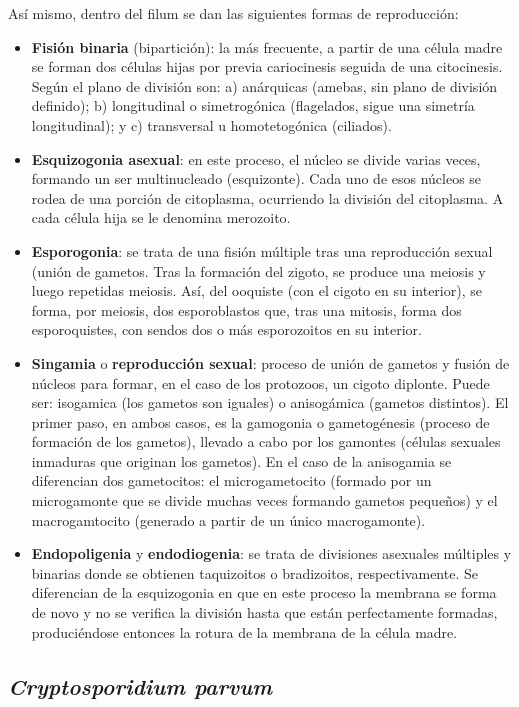 Así mismo, dentro del filum se dan las siguientes formas de reproducción:
\begin{itemize}[itemsep=0pt,parsep=0pt,topsep=0pt,partopsep=0pt]
	\item \textbf{Fisión binaria} (bipartición): la más frecuente, a partir de una célula madre se forman dos células hijas por previa cariocinesis seguida de una citocinesis. Según el plano de división son: a) anárquicas (amebas, sin plano de división definido); b) longitudinal o simetrogónica (flagelados, sigue una simetría longitudinal); y c) transversal u homotetogónica (ciliados).
	\item \textbf{Esquizogonia asexual}: en este proceso, el núcleo se divide varias veces, formando un ser multinucleado (esquizonte). Cada uno de esos núcleos se rodea de una porción de citoplasma, ocurriendo la división del citoplasma. A cada célula hija se le denomina merozoito.
	\item \textbf{Esporogonia}: se trata de una fisión múltiple tras una reproducción sexual (unión de gametos. Tras la formación del zigoto, se produce una meiosis y luego repetidas meiosis. Así, del ooquiste (con el cigoto en su interior), se forma, por meiosis, dos esporoblastos que, tras una mitosis, forma dos esporoquistes, con sendos dos o más esporozoitos en su interior.
	\item \textbf{Singamia} o \textbf{reproducción sexual}: proceso de unión de gametos y fusión de núcleos para formar, en el caso de los protozoos, un cigoto diplonte. Puede ser: isogamica (los gametos son iguales) o anisogámica (gametos distintos). El primer paso, en ambos casos, es la gamogonia o gametogénesis (proceso de formación de los gametos), llevado a cabo por los gamontes (células sexuales inmaduras que originan los gametos). En el caso de la anisogamia se diferencian dos gametocitos: el microgametocito (formado por un microgamonte que se divide muchas veces formando gametos pequeños) y el macrogamtocito (generado a partir de un único macrogamonte).
	\item \textbf{Endopoligenia} y \textbf{endodiogenia}: se trata de divisiones asexuales múltiples y binarias donde se obtienen taquizoitos o bradizoitos, respectivamente. Se diferencian de la esquizogonia en que en este proceso la membrana se forma de novo y no se verifica la división hasta que están perfectamente formadas, produciéndose entonces la rotura de la membrana de la célula madre.
\end{itemize}
\newpage
\subsection{\textit{Cryptosporidium parvum}}
